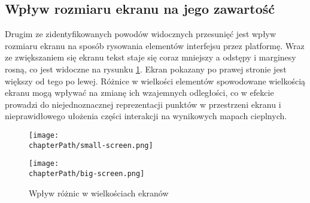 \subsection{Wpływ rozmiaru ekranu na jego zawartość}
Drugim ze zidentyfikowanych powodów widocznych przesunięć jest wpływ rozmiaru ekranu na sposób rysowania elementów interfejsu przez platformę. Wraz ze zwiększaniem się ekranu tekst staje się coraz mniejszy a odstępy i marginesy rosną, co jest widoczne na rysunku \ref{fig:screen_sizes}. Ekran pokazany po prawej stronie jest większy od tego po lewej. Różnice w wielkości elementów spowodowane wielkością ekranu mogą wpływać na zmianę ich wzajemnych odległości, co w efekcie prowadzi do niejednoznacznej reprezentacji punktów w przestrzeni ekranu i nieprawidłowego ułożenia części interakcji na wynikowych mapach cieplnych.

\bigskip
\begin{figure}[H]
\centering
\begin{minipage}{.36\textwidth}
	\centering
	\texttt{[image: \\chapterPath/small-screen.png]}
\end{minipage}
\begin{minipage}{.4\textwidth}
	\centering
	\texttt{[image: \\chapterPath/big-screen.png]}
\end{minipage}
\bigskip
\caption{Wpływ różnic w wielkościach ekranów}
\label{fig:screen_sizes}
\end{figure}
